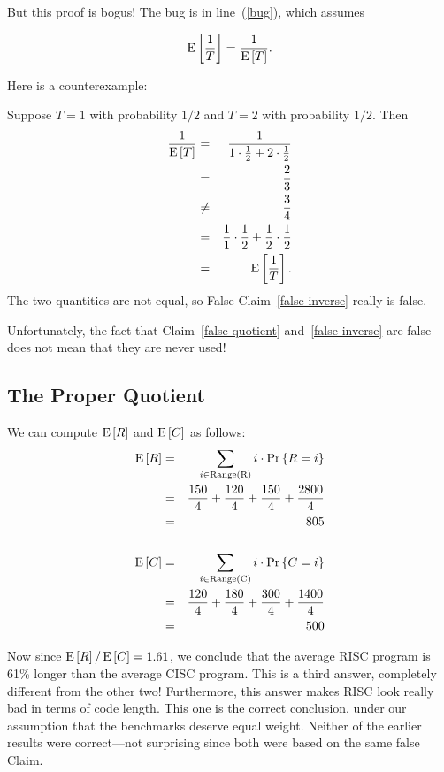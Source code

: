 \documentclass[11pt,twoside]{article}
\begin{document}
But this proof is bogus!  The bug is in line~(\ref{bug}), which assumes
\begin{falsethm}\label{false-inverse}
\[
\mathop{\textup{E}}\nolimits\left[\frac{1}{T}\right] =  \frac{1}{\mathop{\textup{E}}\nolimits\left[T\right]}.
\]
\end{falsethm}
Here is a counterexample:
\begin{example*}
Suppose $T=1$ with probability $1/2$ and $T= 2$ with probability $1/2$.
Then
\begin{eqnarray*}
\frac{1}{\mathop{\textup{E}}\nolimits\left[T\right]} & = &\frac{1}{1 \cdot \frac{1}{2} + 2 \cdot \frac{1}{2}}\\
    & = & \frac{2}{3}\\
    & \neq & \frac{3}{4}\\
    & = &\frac{1}{1} \cdot \frac{1}{2} + \frac{1}{2} \cdot \frac{1}{2}\\
    & = & \mathop{\textup{E}}\nolimits\left[\frac{1}{T}\right].
\end{eqnarray*}
The two quantities are not equal, so False Claim~\ref{false-inverse}
really is false.
\end{example*}

Unfortunately, the fact that Claim~\ref{false-quotient}
and~\ref{false-inverse} are false does not mean that they are never used!

\subsection{The Proper Quotient}

We can compute $\mathop{\textup{E}}\nolimits\left[R\right]$ and $\mathop{\textup{E}}\nolimits\left[C\right]$ as follows:
\begin{eqnarray*}
\mathop{\textup{E}}\nolimits\left[R\right]  & = &   \sum_{i \in \text{Range(R)}} i \cdot \mathop{\textup{Pr}}\nolimits\left\{R = i\right\} \\
        & = &   \frac{150}{4}+\frac{120}{4}+\frac{150}{4}+\frac{2800}{4} \\
        & = &   805 \\
\\
\mathop{\textup{E}}\nolimits\left[C\right]  & = &   \sum_{i \in \text{Range(C)}} i \cdot \mathop{\textup{Pr}}\nolimits\left\{C = i\right\} \\
        & = &   \frac{120}{4}+\frac{180}{4}+\frac{300}{4}+\frac{1400}{4} \\
        & = &   500
\end{eqnarray*}

Now since $\mathop{\textup{E}}\nolimits\left[R\right]/\mathop{\textup{E}}\nolimits\left[C\right] = 1.61$, we conclude that the average
RISC program is 61\% longer than the average CISC program.  This is a
third answer, completely different from the other two!  Furthermore, this
answer makes RISC look really bad in terms of code length.  This one is
the correct conclusion, under our assumption that the benchmarks deserve
equal weight.  Neither of the earlier results were correct---not
surprising since both were based on the same false Claim.
\end{document}
